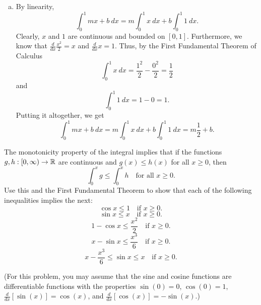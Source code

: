 \documentclass[letterpaper, twoside, 12pt]{book}
\begin{document}
\begin{solution}
\begin{enumerate}[(a)]
          \item By linearity, \[\int_0^1 mx + b ~dx  = m \int_0^1 x ~dx + b \int_0^1 1 ~dx .\]
                Clearly, \(x\) and \(1\) are continuous and bounded on \([0, 1]\). Furthermore,
                we know that \(\frac{d}{dx} \frac{x^2}{2} = x\) and \(\frac{d}{dx} x = 1\). Thus,
                by the First Fundamental Theorem of Calculus
                \[ \int_0^1 x ~dx = \frac{1^2}{2} - \frac{0^2}{2} = \frac{1}{2} \]
                and
                \[ \int_0^1 1 ~dx = 1 - 0 = 1 .\]
                Putting it altogether, we get
                \[ \int_0^1 mx + b ~dx = m \int_0^1 x ~dx + b \int_0^1 1 ~dx = m \frac{1}{2} + b .\]
    \end{enumerate}
\end{solution}


\begin{exercise}[5]
  The monotonicity property of the integral implies that if the functions
  \(g,h:[0,\infty)\to\mathbb R\) are continuous and \(g(x)\leq h(x)\) for all
  \(x\geq 0\), then
  \[
    \int_0^x g\leq \int_0^x h
    \text{~~ for all~} x\geq 0
  .\]
  Use this and the First Fundamental Theorem to show that each of the following
  inequalities implies the next:
  \[
    \cos x \leq 1
    \text{~~ if~} x\geq 0
  .\]
  \[
    \sin x \leq x
    \text{~~ if~} x\geq 0
  .\]
  \[
    1-\cos x \leq \frac{x^2}{2}
    \text{~~ if~} x\geq 0
  .\]
  \[
    x-\sin x \leq \frac{x^3}{6}
    \text{~~ if~} x\geq 0
  .\]
  \[
    x-\frac{x^3}{6} \leq \sin x \leq x
    \text{~~ if~} x\geq 0
  .\]

  (For this problem, you may assume that the sine and cosine functions
  are differentiable functions with the properties
  \(\sin(0)=0\), \(\cos(0)=1\), \(\frac{d}{dx}[\sin(x)]=\cos(x)\),
  and \(\frac{d}{dx}[\cos(x)]=-\sin(x)\).)
\end{exercise}
\begin{solution}

\end{solution}
\end{document}
